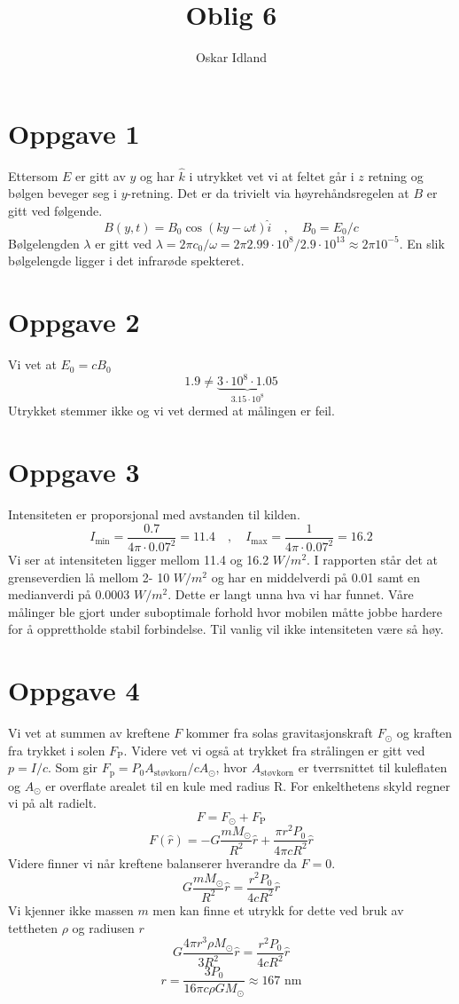 \documentclass{article}
\author{Oskar Idland}
\title{Oblig 6}
\date{}
\begin{document}
\maketitle
\newpage

\section*{Oppgave 1}
Ettersom $E$ er gitt av $y$ og har $\hat{k}$ i utrykket vet vi at feltet går i $z$ retning og bølgen beveger seg i $y$-retning. Det er da trivielt via høyrehåndsregelen at $B$ er gitt ved følgende. 
\[
B(y,t) = B_0 \cos (ky - \omega t) \hat{i} \quad , \quad B_0 = E_0 / c
\] 
Bølgelengden $λ$ er gitt ved $λ =  2πc_0 / ω = 2π2.99 ⋅ 10^{8} / 2.9 ⋅ 10^{13} ≈ 2π10^{-5} $. En slik bølgelengde ligger i det infrarøde spekteret. 

\section*{Oppgave 2}
Vi vet at $E_0 = cB_0$
\[
1.9 ≠ \underbrace{3 \cdot 10^8 ⋅  1.05}_{3.15 \cdot 10^8}
\] 
Utrykket stemmer ikke og vi vet dermed at målingen er feil. 

\section*{Oppgave 3}
Intensiteten er proporsjonal med avstanden til kilden. 
\[
I_{\text{min}} = \frac{0.7}{4 π ⋅  0.07^{2}} = 11.4 \quad , \quad I_{\text{max}} = \frac{1}{4 π ⋅  0.07^{2}} = 16.2
\]
Vi ser at intensiteten ligger mellom 11.4 og 16.2 $W / m^2$. I rapporten står det at grenseverdien lå mellom 2- 10 $W / m^2$ og har en middelverdi på 0.01 samt en medianverdi på 0.0003 $W / m^2$. Dette er langt unna hva vi har funnet. Våre målinger ble gjort under suboptimale forhold hvor mobilen måtte jobbe hardere for å opprettholde stabil forbindelse. Til vanlig vil ikke intensiteten være så høy. 

\section*{Oppgave 4}
Vi vet at summen av kreftene $F$ kommer fra solas gravitasjonskraft $F_{⊙}$ og kraften fra trykket i solen $F_{\text{P}}$. Videre vet vi også at trykket fra strålingen er gitt ved $p = I / c $. Som gir $ F_{\text{p}} = P_0A_{\text{støvkorn}} / cA_{⊙}$, hvor $A_{\text{støvkorn}}$ er tverrsnittet til kuleflaten og $A_{⊙}$ er overflate arealet til en kule med radius R. For enkelthetens skyld regner vi på alt radielt.  
\[
F = F_{⊙} + F_{\text{P}}
\]
\[
F(\hat{r}) = -G\frac{mM_{⊙}}{R^2} \hat{r} + \frac{πr^2P_0 }{4πcR^2} \hat{r}
\]
Videre finner vi når kreftene balanserer hverandre da $F = 0$. 
\[
G\frac{mM_{⊙}}{R^2} \hat{r} = \frac{r^2P_0 }{4cR^2} \hat{r}
\]
Vi kjenner ikke massen $m$ men kan finne et utrykk for dette ved bruk av tettheten $ρ$ og radiusen $r$
\[
G\frac{4πr^3ρM_{⊙}}{3R^2} \hat{r} = \frac{r^2P_0 }{4cR^2} \hat{r}
\]
\[
r = \frac{3P_0}{16πcρGM_{⊙}}  ≈ 167 \text{ nm}
\]
\end{document}

